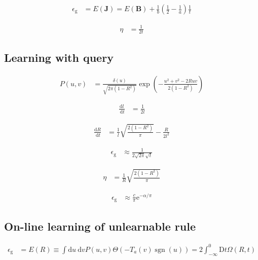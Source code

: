 \documentclass{article}
\begin{document}
\begin{align*}
\epsilon_{\mathrm{g}} &= E(\boldsymbol{J}) = E(\boldsymbol{B}) + \frac{1}{b} \left(\frac{1}{2} - \frac{1}{a}\right) \frac{1}{t} \tag{8.90}
\end{align*}

\begin{align*}
\eta &= \frac{1}{2t} \tag{8.91}
\end{align*}

\subsection{Learning with query}

\begin{align*}
P(u, v) &= \frac{\delta(u)}{\sqrt{2 \pi(1 - R^{2})}} \exp\left(-\frac{u^{2} + v^{2} - 2 R u v}{2(1 - R^{2})}\right) \tag{8.92}
\end{align*}

\begin{align*}
\frac{\mathrm{d} l}{\mathrm{~d} t} &= \frac{1}{2 l} \tag{8.93}
\end{align*}

\begin{align*}
\frac{\mathrm{d} R}{\mathrm{~d} t} &= \frac{1}{l} \sqrt{\frac{2(1 - R^{2})}{\pi}} - \frac{R}{2 l^{2}} \tag{8.94}
\end{align*}

\begin{align*}
\epsilon_{\mathrm{g}} &\approx \frac{1}{2 \sqrt{2 \pi} \sqrt{t}} \tag{8.95}
\end{align*}

\begin{align*}
\eta &= \frac{1}{R} \sqrt{\frac{2(1 - R^{2})}{\pi}} \tag{8.96}
\end{align*}

\begin{align*}
\epsilon_{\mathrm{g}} &\approx \frac{c}{\pi} \mathrm{e}^{-\alpha / \pi} \tag{8.97}
\end{align*}

\subsection{On-line learning of unlearnable rule}

\begin{align*}
\epsilon_{\mathrm{g}} &= E(R) \equiv \int \mathrm{d} u \mathrm{~d} v P(u, v) \Theta\left(-T_{a}(v) \operatorname{sgn}(u)\right) = 2 \int_{-\infty}^{0} \mathrm{D} t \Omega(R, t) \tag{8.98}
\end{align*}
\end{document}
